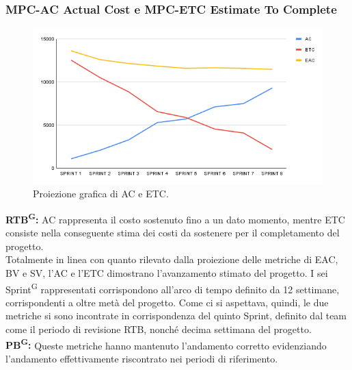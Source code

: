 \documentclass[8pt]{article}
\newcommand{\glossterm}[1]{#1\textsuperscript{G}} %
\begin{document}
\subsubsection{MPC-AC Actual Cost e MPC-ETC Estimate To Complete}
\begin{figure}[h!]
    \centering
    \includegraphics[width=1\textwidth]{images_pdq/ETC_AC.png}
    \caption{Proiezione grafica di AC e ETC.}
    \label{fig:Proiezione grafica di AC e ETC}
\end{figure}
\textbf{\glossterm{RTB}:} AC rappresenta il costo sostenuto fino a un dato momento, mentre ETC consiste nella conseguente stima dei costi da sostenere per il completamento del progetto.\\
Totalmente in linea con quanto rilevato dalla proiezione delle metriche di EAC, BV e SV, l'AC e l'ETC dimostrano l'avanzamento stimato del progetto. I sei \glossterm{Sprint} rappresentati corrispondono all'arco di tempo definito da 12 settimane, corrispondenti a oltre metà del progetto. Come ci si aspettava, quindi, le due metriche si sono incontrate in corrispondenza del quinto Sprint, definito dal team come il periodo di revisione RTB, nonché decima settimana del progetto.\\
\textbf{\glossterm{PB}:} Queste metriche hanno mantenuto l'andamento corretto evidenziando l'andamento effettivamente riscontrato nei periodi di riferimento.
\clearpage
\end{document}
